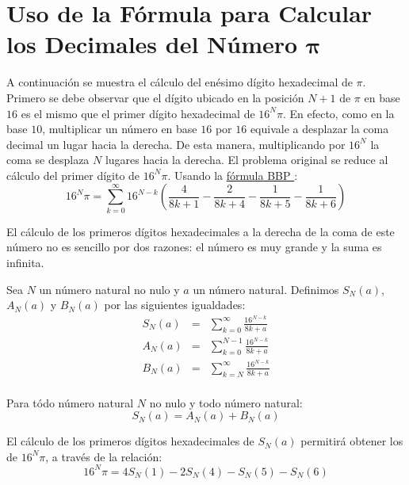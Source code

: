 
\section{Uso de la Fórmula para Calcular los Decimales del Número
  $\boldsymbol{\pi}$}


A continuación se muestra el cálculo del enésimo dígito hexadecimal de
$\pi$. Primero se debe observar que el dígito ubicado en la posición
$N+1$ de $\pi$ en base $16$ es el mismo que el primer dígito
hexadecimal de $16^{N}\pi$. En efecto, como en la base $10$,
multiplicar un número en base $16$ por $16$ equivale a desplazar la
coma decimal un lugar hacia la derecha. De esta manera, multiplicando
por $16^{N}$ la coma se desplaza $N$ lugares hacia la derecha. El
problema original se reduce al cálculo del primer dígito de
$16^{N}\pi$. Usando la \hyperref[eq:bbp]{fórmula BBP }:
\begin{equation*}
  16^{N}\pi =\sum_{k=0}^{\infty}16^{N-k}
  \left(
    \frac{4}{8k+1}
    -\frac{2}{8k+4}
    -\frac{1}{8k+5}
    -\frac{1}{8k+6}
  \right) \nonumber
\end{equation*}
    
El cálculo de los primeros dígitos hexadecimales a la derecha de la
coma de este número no es sencillo por dos razones: el número es muy
grande y la suma es infinita.
  
\begin{definition}
  Sea $N$ un número natural no nulo y $a$ un número natural. Definimos
  $S_{N}(a)$, $A_{N}(a)$ y $B_{N}(a)$ por las siguientes igualdades:
  \begin{eqnarray*}
    S_{N}(a)&=&\sum_{k=0}^{\infty}\frac{16^{N-k}}{8k+a}\\
    A_{N}(a)&=&\sum_{k=0}^{N-1}\frac{16^{N-k}}{8k+a}\\
    B_{N}(a)&=&\sum_{k=N}^{\infty}\frac{16^{N-k}}{8k+a}\\
  \end{eqnarray*}
\end{definition}

\begin{remark}
  Para tódo número natural $N$ no nulo y todo número natural:
  \begin{equation*}
    S_{N}(a) = A_{N}(a)+B_{N}(a)
  \end{equation*}
\end{remark}


El cálculo de los primeros dígitos hexadecimales de $S_{N}(a)$
permitirá obtener los de $16^{N}\pi$, a través de la relación:
\begin{equation*}
  16^{N}\pi=4S_{N}(1)-2S_{N}(4)-S_{N}(5)-S_{N}(6)
\end{equation*}

